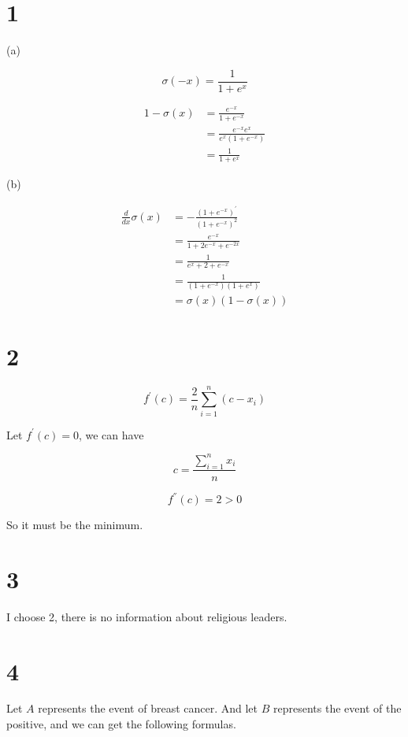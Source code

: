 \documentclass{article}
\begin{document}
\section*{1}

(a)

$$
  \sigma(-x) = \frac{1}{1 + e^{x}}
$$

\begin{align*}
  1 - \sigma(x) &= \frac{e^{-x}}{1 + e^{-x}} \\
                &= \frac{e^{-x}e^{x}}{e^{x}(1 + e^{-x})} \\
                &= \frac{1}{1 + e^{x}}
\end{align*}

(b)

\begin{align*}
  \frac{d}{dx}\sigma(x) &= - \frac{(1 + e ^{-x})^{'}}{(1 + e^{-x})^2} \\
                        &= \frac{e^{-x}}{1 + 2e^{-x} + e^{-2x}} \\
                        &= \frac{1}{e^{x} + 2 + e^{-x}} \\
                        &= \frac{1}{(1 + e^{-x})(1 + e^{x})} \\
                        &= \sigma(x)(1 - \sigma(x))
\end{align*}

\section*{2}

$$
f^{'}(c) =\frac{2}{n}\sum_{i = 1} ^ {n} (c - x _{i})
$$

Let $f^{'}(c) = 0$, we can have

$$
c = \frac{\sum_{i = 1} ^ {n} x_{i}}{n}
$$

$$
f^{''}(c) = 2 > 0
$$

So it must be the minimum.

\section*{3}

I choose 2, there is no information about religious leaders.

\section*{4}

Let $A$ represents the event of breast cancer. And let $B$
represents the event of the positive, and we can get the following
formulas.
\end{document}
